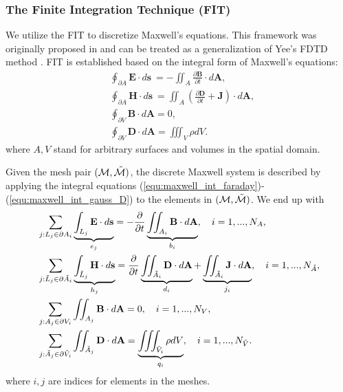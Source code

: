 \documentclass{article}
\begin{document}
\subsubsection{The Finite Integration Technique (FIT)}
We utilize the FIT to discretize Maxwell's equations. This framework was originally proposed in \cite{weiland_1977} and can be treated as a generalization of Yee's FDTD method \cite{yee_1966}. FIT is established based on the integral form of Maxwell's equations:
\begin{subequations}
\begin{align}
    &\oint_{\partial A} \mathbf{E} \cdot d\mathbf{s} \ = - \iint_A \frac{\partial \mathbf{B}}{\partial t} \cdot d\mathbf{A}, \label{equ:maxwell_int_faraday}\\
    &\oint_{\partial A} \mathbf{H} \cdot d\mathbf{s} \ = \iint_A \left(\frac{\partial \mathbf{D}}{\partial t} + \mathbf{J}\right) \cdot d\mathbf{A}, \label{equ:maxwell_int_ampere}\\
    &\oint_{\partial V} \mathbf{B} \cdot d\mathbf{A} = 0, \label{equ:maxwell_int_gauss_B}\\
    &\oint_{\partial V} \mathbf{D} \cdot d\mathbf{A} = \iiint_V \rho dV. \label{equ:maxwell_int_gauss_D}
\end{align}
\end{subequations}
where $A, V$ stand for arbitrary surfaces and volumes in the spatial domain. 

Given the mesh pair $(\mathcal{M}, \Tilde{\mathcal{M}})$, the discrete Maxwell system is described by applying the integral equations (\ref{equ:maxwell_int_faraday})-(\ref{equ:maxwell_int_gauss_D}) to the elements in $(\mathcal{M}, \Tilde{\mathcal{M}})$. We end up with
\begin{subequations}
\begin{align}
    &\sum_{j:L_j\in\partial A_i} \underbrace{\int_{L_j} \mathbf{E} \cdot d\mathbf{s}}_{e_j} = - \frac{\partial}{\partial t} \underbrace{\iint_{A_i} \mathbf{B} \cdot d\mathbf{A}}_{b_i},\ \ \ i = 1,...,N_A, \label{equ:maxwell_grid_faraday} \\
    &\sum_{j:\Tilde{L}_j\in\partial \Tilde{A}_i} \underbrace{\int_{\Tilde{L}_j} \mathbf{H} \cdot d\mathbf{s}}_{h_j} = \frac{\partial}{\partial t} \underbrace{\iint_{\Tilde{A}_i} \mathbf{D} \cdot d\mathbf{A}}_{d_i} + \underbrace{\iint_{\Tilde{A}_i} \mathbf{J} \cdot d\mathbf{A}}_{j_i}, \ \ \ i = 1,...,N_{\Tilde{A}}, \label{equ:maxwell_grid_ampere}\\
    &\sum_{j:A_j\in \partial V_i} \iint_{A_j} \mathbf{B} \cdot d\mathbf{A} = 0,\ \ \ i = 1,..., N_V,\label{equ:maxwell_grid_gauss_B}\\
    &\sum_{j:\Tilde{A}_j \in \partial\Tilde{V}_i}\iint_{\Tilde{A}_j} \mathbf{D} \cdot d\mathbf{A} = \underbrace{\iiint_{\Tilde{V}_i} \rho dV}_{q_i},\ \ \ i = 1,...,N_{\Tilde{V}}. \label{equ:maxwell_grid_gauss_D}
\end{align}
\end{subequations}
where $i, j$ are indices for elements in the meshes.
\end{document}
